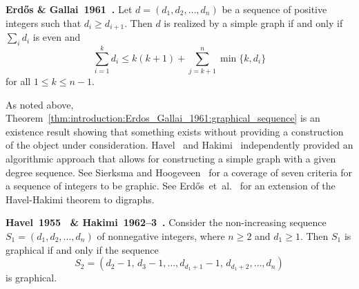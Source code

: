 \begin{theorem}
\label{thm:introduction:Erdos_Gallai_1961:graphical_sequence}
\textbf{Erd\H{o}s \& Gallai~1961~\cite{ErdosGallai1960}.}
Let $d = (d_1, d_2, \dots, d_n)$ be a sequence of positive integers
such that $d_i \geq d_{i+1}$. Then $d$ is realized by a simple graph
if and only if $\sum_i d_i$ is even and
\begin{equation}
\label{eqn:introduction:Erdos_Gallai_1961:graphical_sequence}
\sum_{i=1}^k d_i
\leq
k(k + 1) + \sum_{j=k+1}^n \min\{k, d_i\}
\end{equation}
for all $1 \leq k \leq n - 1$.
\end{theorem}

As noted above,
Theorem~\ref{thm:introduction:Erdos_Gallai_1961:graphical_sequence} is
an existence result showing that something exists without providing a
construction of the object under consideration.
Havel~\cite{Havel1955}
and Hakimi~\cite{Hakimi1962,Hakimi1963}
independently provided an algorithmic approach that allows for
constructing a simple graph with a given degree sequence. See Sierksma
and Hoogeveen~\cite{SierksmaHoogeveen1991} for a coverage of seven
criteria for a sequence of integers to be graphic.
See Erd\H{o}s~et~al.~\cite{ErdosEtAl2010} for an extension of the
Havel-Hakimi theorem to digraphs.

\begin{theorem}
\label{thm:introduction:Havel1955_Hakimi1962:graphical_sequence}
\textbf{Havel~1955~\cite{Havel1955} \&
  Hakimi~1962--3~\cite{Hakimi1962,Hakimi1963}.}
Consider the non-increasing sequence $S_1 = (d_1, d_2, \dots, d_n)$ of
nonnegative integers, where $n \geq 2$ and $d_1 \geq 1$. Then $S_1$ is
graphical if and only if the sequence
\[
S_2
=
(d_2 - 1,\, d_3 - 1, \dots, d_{d_1 + 1} - 1,\, d_{d_1 + 2}, \dots, d_n)
\]
is graphical.
\end{theorem}

